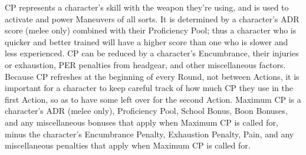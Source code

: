 \documentclass[oneside,11pt,english]{book}
\begin{document}
CP represents a character's skill with the weapon they’re using, and is used to activate and power
Maneuvers of all sorts. It is determined by a character's ADR score (melee only) combined with their
Proficiency Pool; thus a character who is quicker and better trained will have a higher score than one who is slower and less experienced.
CP can be reduced by a character's Encumbrance, their injuries or exhaustion, PER penalties from %
headgear, and other miscellaneous factors. Because CP refreshes at the beginning of every Round, not
between Actions, it is important for a character to keep careful track of how much CP they use in the first
Action, so as to have some left over for the second Action.
Maximum CP is a character's ADR (melee only), Proficiency Pool, School Bonus, Boon Bonuses, and
any miscellaneous bonuses that apply when Maximum CP is called for, minus the character's
Encumbrance Penalty, Exhaustion Penalty, Pain, and any miscellaneous penalties that apply when
Maximum CP is called for.
%
%
%
%
\end{document}
